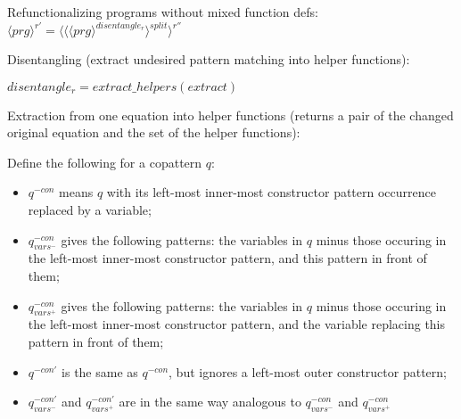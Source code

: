 \documentclass[11pt]{article} %
\begin{document}
Refunctionalizing programs without mixed function defs: $\langle prg \rangle^{r'} = \langle \langle \langle prg \rangle^{disentangle_r} \rangle^{split} \rangle^{r''}$

Disentangling (extract undesired pattern matching into helper functions):

$disentangle_r = extract\_helpers(extract)$

Extraction from one equation into helper functions (returns a pair of the changed original equation and the set of the helper functions):

Define the following for a copattern $q$:

\begin{itemize}
\item $q^{-con}$ means $q$ with its left-most inner-most constructor pattern occurrence replaced by a variable;
\item $q^{-con}_{vars^-}$ gives the following patterns: the variables in $q$ minus those occuring in the left-most inner-most constructor pattern, and this pattern in front of them;
\item $q^{-con}_{vars^+}$ gives the following patterns: the variables in $q$ minus those occuring in the left-most inner-most constructor pattern, and the variable replacing this pattern in front of them;
\item $q^{-con'}$ is the same as $q^{-con}$, but ignores a left-most outer constructor pattern;
\item $q^{-con'}_{vars^-}$ and $q^{-con'}_{vars^+}$ are in the same way analogous to $q^{-con}_{vars^-}$ and $q^{-con}_{vars^+}$
\end{itemize}
\end{document}
